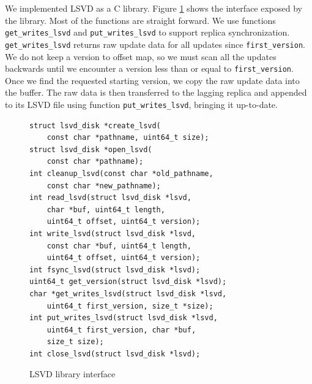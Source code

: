 We implemented LSVD as a C library. Figure \ref{fig:lsvdinterface} shows the interface exposed by the library. Most of the functions are straight forward. We use functions \texttt{get\_writes\_lsvd} and \texttt{put\_writes\_lsvd} to support replica synchronization. \texttt{get\_writes\_lsvd} returns raw update data for all updates since \texttt{first\_version}. We do not keep a version to offset map, so we must scan all the updates backwards until we encounter a version less than or equal to \texttt{first\_version}. Once we find the requested starting version, we copy the raw update data into the buffer. The raw data is then transferred to the lagging replica and appended to its LSVD file using function \texttt{put\_writes\_lsvd}, bringing it up-to-date.

\lstset{basicstyle=\ttfamily\small, columns=fullflexible, language=C}
\lstset{frame=tlrb}
\begin{figure}
\begin{lstlisting}
struct lsvd_disk *create_lsvd(
	const char *pathname, uint64_t size);
struct lsvd_disk *open_lsvd(
	const char *pathname);
int cleanup_lsvd(const char *old_pathname, 
	const char *new_pathname);
int read_lsvd(struct lsvd_disk *lsvd,
	char *buf, uint64_t length,
	uint64_t offset, uint64_t version);
int write_lsvd(struct lsvd_disk *lsvd,
	const char *buf, uint64_t length, 
	uint64_t offset, uint64_t version);
int fsync_lsvd(struct lsvd_disk *lsvd);
uint64_t get_version(struct lsvd_disk *lsvd);
char *get_writes_lsvd(struct lsvd_disk *lsvd, 
	uint64_t first_version, size_t *size);
int put_writes_lsvd(struct lsvd_disk *lsvd, 
	uint64_t first_version, char *buf,
	size_t size);
int close_lsvd(struct lsvd_disk *lsvd);
\end{lstlisting}
\caption{LSVD library interface}
\label{fig:lsvdinterface}
\end{figure}
